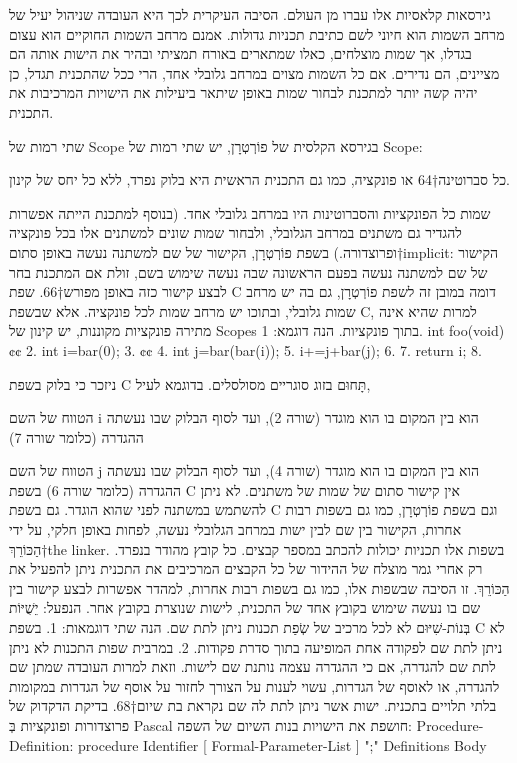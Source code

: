       גירסאות קלאסיות אלו עברו מן העולם. הסיבה העיקרית לכך היא העובדה שניהול
      יעיל של מרחב השמות הוא חיוני לשם כתיבת תכניות גדולות. אמנם מרחב השמות
      החוקיים הוא עצום בגדלו, אך שמות מוצלחים, כאלו שמתארים באורח תמציתי ובהיר
      את הישות אותה הם מציינים, הם נדירים. אם כל השמות מצוים במרחב גלובלי אחד,
      הרי ככל שהתכנית תגדל, כן יהיה קשה יותר למתכנת לבחור שמות באופן שיתאר
      ביעילות את הישויות המרכיבות את התכנית.

      שתי רמות של Scope
      בגירסא הקלסית של פוֹרְטְרָן, יש שתי רמות של Scope:
      \begin{ציינון}
\item כל סברוטינה†{64} או פונקציה, כמו גם התכנית הראשית היא בלוק נפרד, ללא כל יחס של קינון.
\item שמות כל הפונקציות והסברוטינות היו במרחב גלובלי אחד.
      (בנוסף למתכנת הייתה אפשרות להגדיר גם משתנים במרחב הגלובלי, ולבחור שמות שונים למשתנים אלו בכל פונקציה ופרוצדורה.)
      בשפת פוֹרְטְרָן, הקישור של שם למשתנה נעשה באופן סתום†{implicit}: הקישור של שם למשתנה נעשה בפעם הראשונה שבה נעשה שימוש בשם, זולת אם המתכנת בחר לבצע קישור כזה באופן מפורש†{66}.
      שפת C דומה במובן זה לשפת פוֹרְטְרָן, גם בה יש מרחב שמות גלובלי, ובתוכו יש מרחב שמות לכל פונקציה. אלא שבשפת C, למרות שהיא אינה מתירה פונקציות מקוננות, יש קינון של Scopes בתוך פונקציות.
      הנה דוגמא:
      1. int foo(void) {¢¢
        2. int i=bar(0);
        3. {¢¢
          4. int j=bar(bar(i));
          5. i+=j+bar(j);
        6. }
        7. return i;
      8. }
  \end{ציינון}

      ניזכר כי בלוק בשפת C תָּחוּם בזוג סוגריים מסולסלים.
      בדוגמא לעיל,
      \begin{ציינון}
\item הטווח של השם i הוא בין המקום בו הוא מוגדר (שורה 2), ועד לסוף הבלוק שבו נעשתה ההגדרה (כלומר שורה 7)
\item הטווח של השם j הוא בין המקום בו הוא מוגדר (שורה 4), ועד לסוף הבלוק שבו נעשתה ההגדרה (כלומר שורה 6)
      בשפת C אין קישור סתום של שמות של משתנים. לא ניתן להשתמש במשתנה לפני שהוא הוגדר.
      גם בשפת C וגם בשפת פוֹרְטְרָן, כמו גם בשפות רבות אחרות, הקישור בין שם לבין ישות במרחב הגלובלי נעשה, לפחות באופן חלקי, על ידי הַכּוֹרֵךְ†{the linker}. בשפות אלו תכניות יכולות להכתב במספר קבצים. כל קובץ מהודר בנפרד. רק אחרי גמר מוצלח של ההידור של כל הקבצים המרכיבים את התכנית ניתן להפעיל את הַכּוֹרֵךְ. זו הסיבה שבשפות אלו, כמו גם בשפות רבות אחרות, למהדר אפשרות לבצע קישור בין שם בו נעשה שימוש בקובץ אחד של התכנית, לישות שנוצרת בקובץ אחר.
      הנפעל: יֵשֻׁיּוֹת בְּנוֹת-שִׁיּוּם
      לא לכל מרכיב של שְׂפַת תכנות ניתן לתת שם. הנה שתי דוגמאות:
      1. בשפת C לא ניתן לתת שם לפקודה אחת המופיעה בתוך סדרת פקודות.
      2. במרבית שפות התכנות לא ניתן לתת שם להגדרה, אם כי ההגדרה עצמה נותנת שם לישות. וזאת למרות העובדה שמתן שם להגדרה, או לאוסף של הגדרות, עשוי לענות על הצורך לחזור על אוסף של הגדרות במקומות בלתי תלויים בתכנית.
      ישות אשר ניתן לתת לה שם נקראת בת שיום†{68}.
      בדיקת הדקדוק של פרוצדורות ופונקציות בְּ Pascal חושפת את הישויות בנות השיום של השפה:
      Procedure-Definition:
      procedure Identifier [ Formal-Parameter-List ] ";" Definitions Body
  \end{ציינון}

